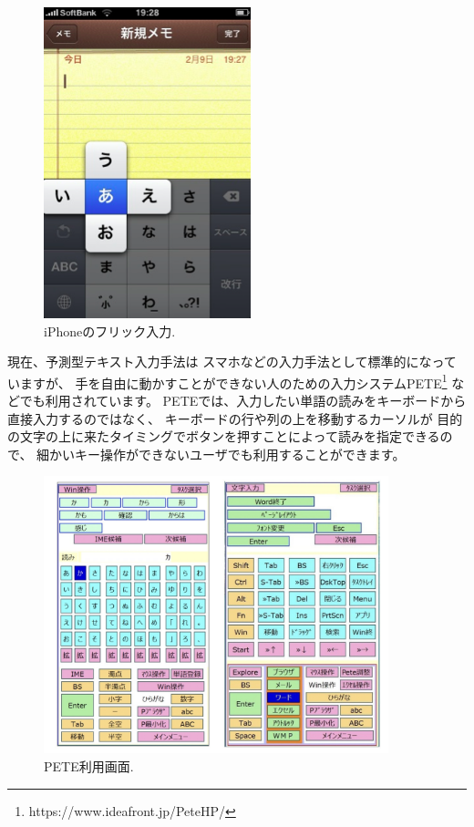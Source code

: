\documentclass[topics]{compsoft} %
\begin{document}
\begin{figure}[h]
  \centerline{\includegraphics[width=6cm,bb=0 0 294 442]{figures/1691febad27439d3bf44232c54dcb1e8.png}}
  \caption{iPhoneのフリック入力.}
  \label{flick}
\end{figure}

現在、予測型テキスト入力手法は
スマホなどの入力手法として標準的になっていますが、
手を自由に動かすことができない人のための入力システムPETE\footnote{
  \textsf{https:{\slash}{\slash}www.ideafront.jp{\slash}PeteHP{\slash}}
}
などでも利用されています。
PETEでは、入力したい単語の読みをキーボードから直接入力するのではなく、
キーボードの行や列の上を移動するカーソルが
目的の文字の上に来たタイミングでボタンを押すことによって読みを指定できるので、
細かいキー操作ができないユーザでも利用することができます。

\begin{figure}[h]
  \includegraphics[width=10cm,bb=0 0 1456 1172]{figures/a2f652e2f488b96974e92f8198f49469.jpg}
  \caption{PETE利用画面.}
  \label{pete}
\end{figure}
\end{document}
